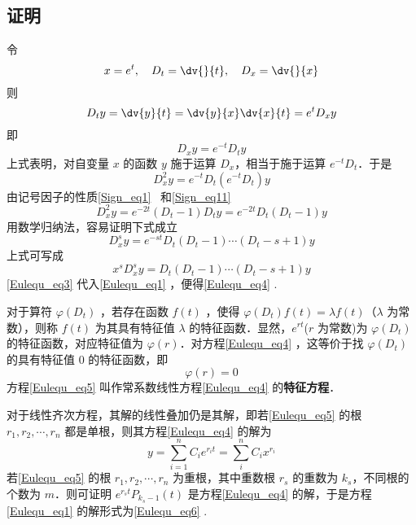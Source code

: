 \subsection{证明}
令
\begin{equation}
x=e^t,\quad D_t=\dv{}{t},\quad D_x=\dv{}{x}
\end{equation}
则
\begin{equation}
D_ty=\dv{y}{t}=\dv{y}{x}\dv{x}{t}=e^tD_xy
\end{equation}
即
\begin{equation}
D_xy=e^{-t}D_ty
\end{equation}
上式表明，对自变量 $x$ 的函数 $y$ 施于运算 $D_x$，相当于施于运算 $e^{-t}D_t$．于是
\begin{equation}
D_x^2y=e^{-t}D_t(e^{-t}D_t)y
\end{equation}
由记号因子的性质\autoref{Sign_eq1}~ 和\autoref{Sign_eq11}~
\begin{equation}
D_x^2y=e^{-2t}(D_t-1)D_ty=e^{-2t}D_t(D_t-1)y
\end{equation}
用数学归纳法，容易证明下式成立
\begin{equation}
D_x^sy=e^{-st}D_t(D_t-1)\cdots (D_t-s+1)y
\end{equation}
上式可写成
\begin{equation}\label{Eulequ_eq3}
x^sD_x^sy=D_t(D_t-1)\cdots (D_t-s+1)y
\end{equation}
\autoref{Eulequ_eq3} 代入\autoref{Eulequ_eq1} ，便得\autoref{Eulequ_eq4} .

对于算符 $\varphi(D_t)$ ，若存在函数 $f(t)$ ，使得
$\varphi(D_t)f(t)=\lambda f(t)$（$\lambda$ 为常数），则称 $f(t)$ 为其具有特征值 $\lambda$ 的特征函数．显然，$e^{rt}$($r$ 为常数)为 $\varphi(D_t)$ 的特征函数，对应特征值为 $\varphi(r)$．对方程\autoref{Eulequ_eq4} ，这等价于找 $\varphi(D_t)$ 的具有特征值 $0$ 的特征函数，即
\begin{equation}\label{Eulequ_eq5}
\varphi(r)=0
\end{equation}
方程\autoref{Eulequ_eq5} 叫作常系数线性方程\autoref{Eulequ_eq4} 的\textbf{特征方程}．

对于线性齐次方程，其解的线性叠加仍是其解，即若\autoref{Eulequ_eq5} 的根 $r_1,r_2,\cdots,r_n$ 都是单根，则其方程\autoref{Eulequ_eq4} 的解为
\begin{equation}
y=\sum_{i=1}^{n}C_ie^{r_it}=\sum_i^{n}C_ix^{r_i}
\end{equation}
 若\autoref{Eulequ_eq5} 的根 $r_1,r_2,\cdots,r_n$ 为重根，其中重数根 $r_s$ 的重数为 $k_s$，不同根的个数为 $m$．则可证明 $e^{r_st}P_{k_s-1}(t)$ 是方程\autoref{Eulequ_eq4} 的解，于是方程\autoref{Eulequ_eq1} 的解形式为\autoref{Eulequ_eq6} .
